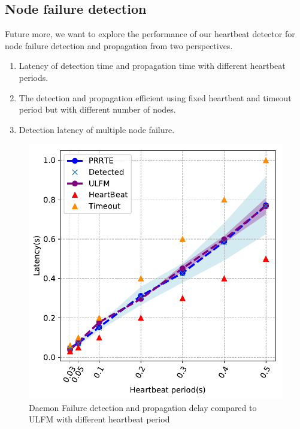\documentclass[sigconf]{acmart}
\begin{document}
\subsection{Node failure detection}
Future more, we want to explore the performance of our heartbeat detector  for node failure detection and propagation from two perspectives. 
\begin{enumerate}
  \item Latency of detection time and propagation time with different heartbeat periods.
  \item The detection and propagation efficient using fixed heartbeat and timeout period but with different number of nodes.
  \item Detection latency of multiple node failure.
\end{enumerate}

\begin{figure}[h]
  \centering
  \includegraphics[width=\linewidth]{PRRTE_ULFM_new_nodebug.pdf}
  \caption{Daemon Failure detection and propagation delay compared to ULFM with different heartbeat period}
\end{figure}
\end{document}

